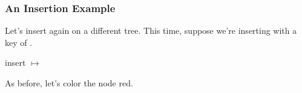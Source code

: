 \documentclass[aspectratio=169, handout]{beamer}
\begin{document}
\begin{frame}
  \frametitle{An Insertion Example}

  Let's insert again on a different tree. This time, suppose we're inserting
  with a key of .

  \pause
  \vspace{\fill}

  \begin{center}
    \begin{minipage}{0.33\textwidth}
      \begin{adjustbox}{center}
      \end{adjustbox}
    \end{minipage}
    \pause
    \begin{minipage}{0.15\textwidth}
      \begin{center}
        insert  $\mapsto$
      \end{center}
    \end{minipage}
    \begin{minipage}{0.33\textwidth}
        \begin{adjustbox}{center}
        \end{adjustbox}
    \end{minipage}
  \end{center}

  \pause
  \vspace{\fill}

  As before, let's color the node red.
\end{frame}
\end{document}
